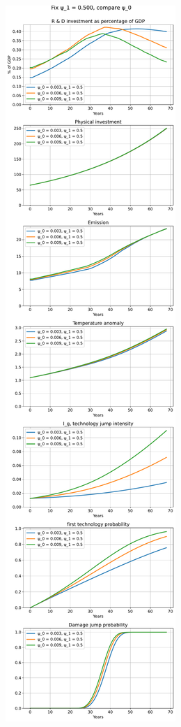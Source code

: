 \documentclass{article}
\begin{document}
	\begin{figure}
		\centering
		\includegraphics{../figures/psi_1_0.500.pdf}
	\end{figure}
\end{document}
